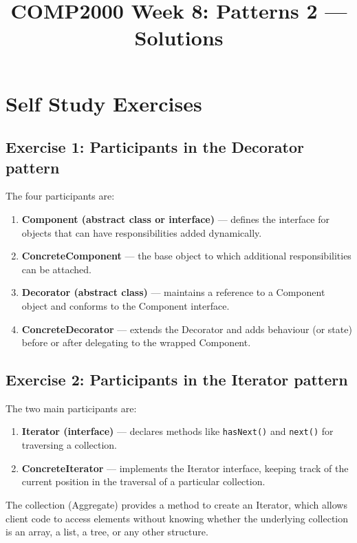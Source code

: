 \documentclass[twoside=false,DIV=14]{scrartcl}
\title{\color{redish} \vspace{-1em}COMP2000 Week 8: Patterns 2 --- Solutions}
\begin{document}
{\color{blackish}\maketitle}\vspace{-7em}

\section*{Self Study Exercises}

\subsection*{Exercise 1: Participants in the Decorator pattern}

The four participants are:
\begin{enumerate}
    \item \textbf{Component (abstract class or interface)} --- defines the interface for objects that can have responsibilities added dynamically.
    \item \textbf{ConcreteComponent} --- the base object to which additional responsibilities can be attached.
    \item \textbf{Decorator (abstract class)} --- maintains a reference to a Component object and conforms to the Component interface.
    \item \textbf{ConcreteDecorator} --- extends the Decorator and adds behaviour (or state) before or after delegating to the wrapped Component.
\end{enumerate}

\subsection*{Exercise 2: Participants in the Iterator pattern}

The two main participants are:
\begin{enumerate}
    \item \textbf{Iterator (interface)} --- declares methods like \texttt{hasNext()} and \texttt{next()} for traversing a collection.
    \item \textbf{ConcreteIterator} --- implements the Iterator interface, keeping track of the current position in the traversal of a particular collection.
\end{enumerate}
The collection (Aggregate) provides a method to create an Iterator, which allows client code to access elements without knowing whether the underlying collection is an array, a list, a tree, or any other structure.
\end{document}
